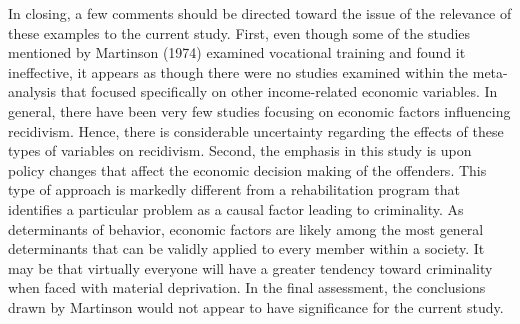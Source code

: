In closing, a few comments should be directed toward the issue of the relevance of these examples to the current study.  First, even though some of the studies mentioned by Martinson (1974) examined vocational training and found it ineffective, it appears as though there were no studies examined within the meta-analysis that focused specifically on other income-related economic variables.  In general, there have been very few studies focusing on economic factors influencing recidivism.  Hence, there is considerable uncertainty regarding the effects of these types of variables on recidivism.  Second, the emphasis in this study is upon policy changes that affect the economic decision making of the offenders.  This type of approach is markedly different from a rehabilitation program that identifies a particular problem as a causal factor leading to criminality.  As determinants of behavior, economic factors are likely among the most general determinants that can be validly applied to every member within a society.  It may be that virtually everyone will have a greater tendency toward criminality when faced with material deprivation.  In the final assessment, the conclusions drawn by Martinson would not appear to have significance for the current study.

